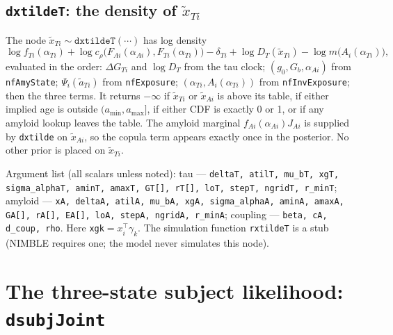 \documentclass[11pt]{article}
\newcommand{\code}[1]{\texttt{#1}}
\begin{document}
\subsection{\code{dxtildeT}: the density of $\tilde x_{Ti}$}

The node $\tilde x_{Ti}\sim\code{dxtildeT}(\cdots)$ has log density
\begin{equation}
\log f_{Ti}(\alpha_{Ti})+\log c_\rho\big(F_{Ai}(\alpha_{Ai}),F_{Ti}(\alpha_{Ti})\big)
-\delta_{Ti}+\log D_T(\tilde x_{Ti})-\log m\big(A_i(\alpha_{Ti})\big),
\label{eq:dxt}
\end{equation}
evaluated in the order: $\Delta G_{Ti}$ and $\log D_T$ from the tau clock;
$(g_0,G_b,\alpha_{Ai})$ from \code{nfAmyState}; $\Psi_i(\tilde a_{Ti})$ from
\code{nfExposure}; $(\alpha_{Ti},A_i(\alpha_{Ti}))$ from \code{nfInvExposure};
then the three terms. It returns $-\infty$ if $\tilde x_{Ti}$ or $\tilde x_{Ai}$ is
above its table, if either implied age is outside $(a_{\min},a_{\max}]$, if either
CDF is exactly 0 or 1, or if any amyloid lookup leaves the table. The amyloid
marginal $f_{Ai}(\alpha_{Ai})J_{Ai}$ is supplied by \code{dxtilde} on
$\tilde x_{Ai}$, so the copula term appears exactly once in the posterior. No other
prior is placed on $\tilde x_{Ti}$.

Argument list (all scalars unless noted): tau --- \code{deltaT, atilT, mu\_bT, xgT,
sigma\_alphaT, aminT, amaxT, GT[], rT[], loT, stepT, ngridT, r\_minT}; amyloid ---
\code{xA, deltaA, atilA, mu\_bA, xgA, sigma\_alphaA, aminA, amaxA, GA[], rA[], EA[],
loA, stepA, ngridA, r\_minA}; coupling --- \code{beta, cA, d\_coup, rho}.
Here \code{xgk}$=x_i^\top\gamma_k$. The simulation function \code{rxtildeT} is a
stub (NIMBLE requires one; the model never simulates this node).

\section{The three-state subject likelihood: \code{dsubjJoint}}\label{sec:densities}
\end{document}
